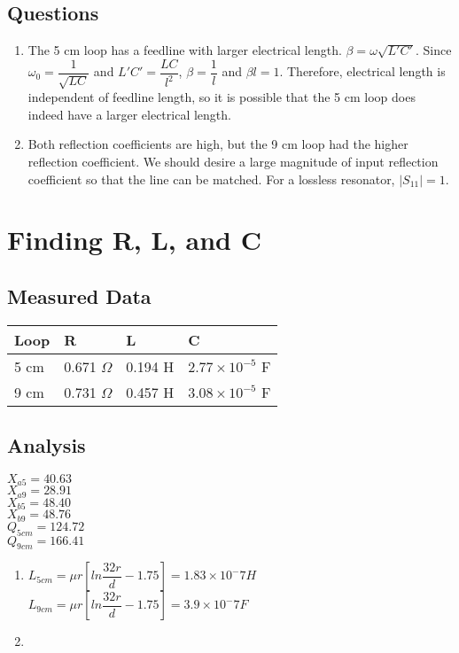 \documentclass{article}
\begin{document}
\subsection{Questions}
\begin{enumerate}
	\item The 5 cm loop has a feedline with larger electrical length. $\beta = \omega\sqrt{L'C'}$. Since $\omega_0 = \dfrac{1}{\sqrt{LC}}$ and $L'C' = \dfrac{LC}{l^2}$, $\beta = \dfrac{1}{l}$ and $\beta l = 1$. Therefore, electrical length is independent of feedline length, so it is possible that the 5 cm loop does indeed have a larger electrical length.
	\item Both reflection coefficients are high, but the 9 cm loop had the higher reflection coefficient. We should desire a large magnitude of input reflection coefficient so that the line can be matched. For a lossless resonator, $\vert S_{11} \vert = 1$.
\end{enumerate}


\section{Finding R, L, and C}

\subsection{Measured Data}
\begin{table}[H]
\centering
\begin{tabular}{|l|l|l|l|}
\hline
Loop & R & L & C \\ \hline
5 cm & 0.671 $\Omega$  & 0.194 H  & $2.77\times10^{-5}$ F \\ \hline
9 cm & 0.731 $\Omega$  & 0.457 H & $3.08\times10^{-5}$ F \\ \hline
\end{tabular}
\end{table}

\subsection{Analysis}
$X_{a5} = 40.63$ \\
$X_{a9} = 28.91$ \\
$X_{b5} = 48.40$ \\
$X_{b9} = 48.76$ \\
$Q_{5cm} = 124.72$ \\
$Q_{9cm} = 166.41$ \\
\begin{enumerate}
	\item $L_{5cm} = \mu r[ln\dfrac{32r}{d} - 1.75] = 1.83\times 10^-7 H$ \\
		  $L_{9cm} = \mu r[ln\dfrac{32r}{d} - 1.75] = 3.9\times 10^-7 F$
	\item
\end{enumerate}
\end{document}
